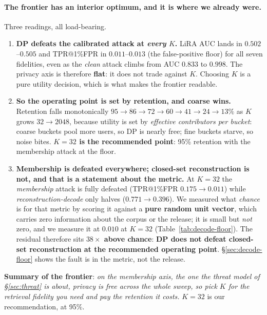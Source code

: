 \documentclass[pdflatex,sn-mathphys-num,12pt]{sn-jnl}
\theoremstyle{thmstyleone}%
\theoremstyle{thmstyletwo}%
\theoremstyle{thmstylethree}%
\newcommand{\secref}[1]{\S\ref{#1}}
\begin{document}
\paragraph{The frontier has an interior optimum, and it is where we already were.}
Three readings, all load-bearing.

\begin{enumerate}
  \item \textbf{DP defeats the calibrated attack at \emph{every} $K$.} LiRA AUC lands in
    $0.502$--$0.505$ and TPR@1\%FPR in $0.011$--$0.013$ (the false-positive floor)
    for all seven fidelities, even as the \emph{clean} attack climbs from AUC $0.833$ to
    $0.998$. The privacy axis is therefore \textbf{flat}: it does not trade against $K$.
    Choosing $K$ is a pure utility decision, which is what makes the frontier readable.

  \item \textbf{So the operating point is set by retention, and coarse wins.} Retention
    falls monotonically $95 \to 86 \to 72 \to 60 \to 41 \to 24 \to 13\%$ as $K$ grows
    $32 \to 2048$, because utility is set by \emph{effective contributors per bucket}:
    coarse buckets pool more users, so DP is nearly free; fine buckets starve, so noise
    bites. \textbf{$K = 32$ is the recommended point}: 95\% retention with the membership
    attack at the floor.

  \item \textbf{Membership is defeated everywhere; closed-set reconstruction is not, and
    that is a statement about the metric.} At $K = 32$ the \emph{membership} attack is
    fully defeated (TPR@1\%FPR $0.175 \to 0.011$) while \emph{reconstruction-decode} only
    halves ($0.771 \to 0.396$). We measured what \emph{chance} is for that metric by
    scoring it against a \textbf{pure random unit vector}, which carries zero information
    about the corpus or the release; it is small but \emph{not} zero, and we measure it at
    $0.010$ at $K = 32$ (Table~\ref{tab:decode-floor}). The residual therefore sits
    \textbf{$38\times$ above chance}: \textbf{DP does not defeat closed-set reconstruction
    at the recommended operating point}. \secref{sec:decode-floor} shows the fault is in the
    metric, not the release.
\end{enumerate}

\noindent\textbf{Summary of the frontier}: \emph{on the membership axis, the one the threat
model of \secref{sec:threat} is about, privacy is free across the whole sweep, so pick $K$
for the retrieval fidelity you need and pay the retention it costs.} $K = 32$ is our
recommendation, at 95\%.
\end{document}
